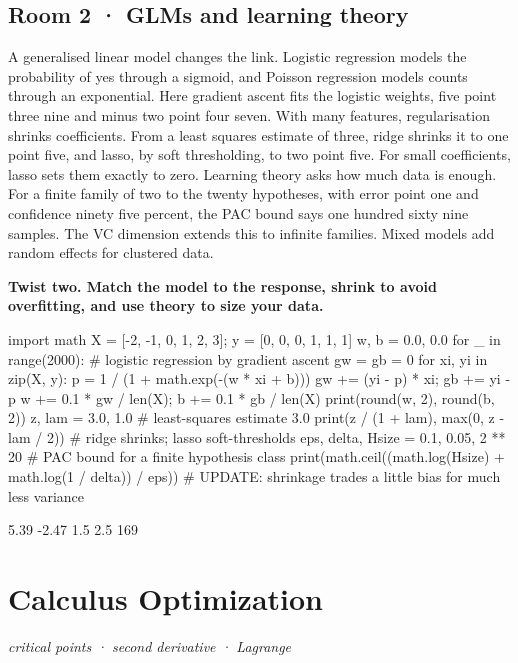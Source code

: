\documentclass[11pt,a4paper]{report}
\begin{document}
\section*{Room 2 · GLMs and learning theory}
A generalised linear model changes the link. Logistic regression models the probability of yes through a sigmoid, and Poisson regression models counts through an exponential. Here gradient ascent fits the logistic weights, five point three nine and minus two point four seven. With many features, regularisation shrinks coefficients. From a least squares estimate of three, ridge shrinks it to one point five, and lasso, by soft thresholding, to two point five. For small coefficients, lasso sets them exactly to zero. Learning theory asks how much data is enough. For a finite family of two to the twenty hypotheses, with error point one and confidence ninety five percent, the PAC bound says one hundred sixty nine samples. The VC dimension extends this to infinite families. Mixed models add random effects for clustered data.
\begin{tcolorbox}[colback=yellow!12,colframe=orange!70!black,boxrule=0.4pt,left=4pt,right=4pt,top=2pt,bottom=2pt]\textbf{Twist two. Match the model to the response, shrink to avoid overfitting, and use theory to size your data.}\end{tcolorbox}
\begin{Code}
import math
X = [-2, -1, 0, 1, 2, 3]; y = [0, 0, 0, 1, 1, 1]
w, b = 0.0, 0.0
for _ in range(2000):                       # logistic regression by gradient ascent
    gw = gb = 0
    for xi, yi in zip(X, y):
        p = 1 / (1 + math.exp(-(w * xi + b)))
        gw += (yi - p) * xi; gb += yi - p
    w += 0.1 * gw / len(X); b += 0.1 * gb / len(X)
print(round(w, 2), round(b, 2))
z, lam = 3.0, 1.0                           # least-squares estimate 3.0
print(z / (1 + lam), max(0, z - lam / 2))   # ridge shrinks; lasso soft-thresholds
eps, delta, Hsize = 0.1, 0.05, 2 ** 20      # PAC bound for a finite hypothesis class
print(math.ceil((math.log(Hsize) + math.log(1 / delta)) / eps))
# UPDATE: shrinkage trades a little bias for much less variance
\end{Code}
\begin{Out}
5.39 -2.47
1.5 2.5
169
\end{Out}
\chapter{Calculus Optimization}
\textit{critical points · second derivative · Lagrange}
\end{document}
